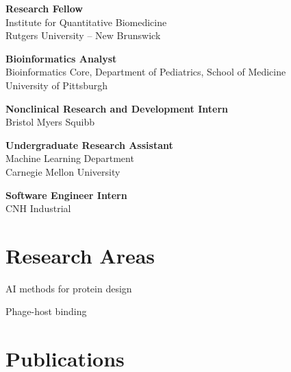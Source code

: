 \documentclass[11pt,letterpaper]{report} %
\newcommand{\listitemspace}{0.25em}
\renewenvironment{itemize}
{\begin{list}{}{\setlength{\leftmargin}{0em}
                \setlength{\parskip}{0em}
                \setlength{\itemsep}{\listitemspace}
                \setlength{\parsep}{\listitemspace}}}
{\end{list}}
\begin{document}
    \begin{tablist}

        \item[2026--present]   \tab{}\textbf{Research Fellow} \\
        \tab{}Institute for Quantitative Biomedicine\\
        \tab{}Rutgers University -- New Brunswick

        \item[2024--2025]   \tab{}\textbf{Bioinformatics Analyst} \\
        \tab{}Bioinformatics Core, Department of Pediatrics, School of Medicine\\
        \tab{}University of Pittsburgh

        \item[2023] \tab{}\tab{}\textbf{Nonclinical Research and Development Intern} \\
        \tab{}Bristol Myers Squibb

        \item[2022--2023] \tab{}\textbf{Undergraduate Research Assistant} \\
        \tab{}Machine Learning Department\\
        \tab{}Carnegie Mellon University

        \item[2022] \tab{}\tab{}\textbf{Software Engineer Intern} \\
        \tab{}CNH Industrial

    \end{tablist}



    \section*{Research Areas}

    \begin{itemize}

        \item AI methods for protein design
        \item Phage-host binding

    \end{itemize}



    \section*{Publications}
\end{document}
